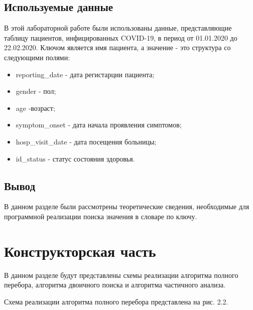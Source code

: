 \documentclass[12pt]{report}
\begin{document}
\section{Используемые данные}
В этой лабораторной работе были использованы данные, представляющие таблицу пациентов, инфицированных COVID-19, в период от 01.01.2020 до 22.02.2020. Ключом является имя пациента, а значение - это структура со следующими полями:
\begin{itemize}
\item reporting\_date - дата регистарции пациента;
\item gender - пол;
\item age -возраст;
\item symptom\_onset - дата начала проявления симптомов;
\item hosp\_visit\_date - дата посещения больницы;
\item id\_status - статус состояния здоровья.
\end{itemize} 

\section{Вывод}

В данном разделе были рассмотрены теоретические сведения, необходимые для программной реализации поиска значения в словаре по ключу.
 
\chapter{Конструкторская часть}

В данном разделе будут представлены схемы реализации алгоритма полного перебора, алгоритма двоичного поиска и алгоритма частичного анализа.

Схема реализации алгоритма полного перебора представлена на рис. 2.2.
\end{document}
